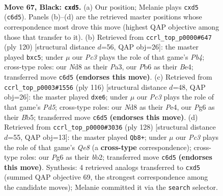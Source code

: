 \documentclass[11pt]{article}
\begin{document}
\clearpage

\begin{figure}[p]\centering
\begin{subfigure}{0.46\textwidth}\centering
\resizebox{\linewidth}{!}{%
\newchessgame
\chessboard[
  setfen={3n4/2k3p1/1pp3p1/p1pQ4/8/2P5/KP6/8 b - - 0 67},
  showmover=false,
  pgfstyle=straightmove, color=movearrow, markmove={c6-d5}
]}
\caption{}
\end{subfigure}\hfill
\begin{subfigure}{0.46\textwidth}\centering
\resizebox{\linewidth}{!}{%
\newchessgame
\chessboard[
  setfen={5k2/5p2/p7/1pq2P2/1P2B2b/P7/2P5/5K2 w - - 0 61},
  showmover=false,
  pgfstyle=straightmove, color=movearrow, markmove={b4-c5}
]}
\caption{}
\end{subfigure}
\\[4pt]
\begin{subfigure}{0.46\textwidth}\centering
\resizebox{\linewidth}{!}{%
\newchessgame
\chessboard[
  setfen={3b4/8/4q2k/1B1Pp2p/4Pp2/5P2/6PK/8 w - - 0 59},
  showmover=false,
  pgfstyle=straightmove, color=movearrow, markmove={d5-e6}
]}
\caption{}
\end{subfigure}\hfill
\begin{subfigure}{0.46\textwidth}\centering
\resizebox{\linewidth}{!}{%
\newchessgame
\chessboard[
  setfen={4Q3/8/1kq5/8/1P2pP2/P6P/1b4PK/8 w - - 3 65},
  showmover=false,
  pgfstyle=straightmove, color=movearrow, markmove={e8-b8}
]}
\caption{}
\end{subfigure}
\caption{\textbf{Move 67, Black: \texttt{cxd5}.} (a) Our position; Melanie plays \texttt{cxd5} (\texttt{c6d5}). Panels (b)--(d) are the retrieved master positions whose correspondence most drove this move (highest QAP objective among those that transfer to it). (b) Retrieved from \texttt{ccrl\_top\_p0000\#647} (ply 120) [structural distance $d$=56, QAP obj=26]: the master played \texttt{bxc5}; under $\mu$ our \emph{Pc3} plays the role of that game's \emph{Pb4}; cross-type roles: our \emph{N}d8 as their \emph{P}a3, our \emph{P}b6 as their \emph{B}e4; transferred move \texttt{c6d5} \textbf{(endorses this move)}. (c) Retrieved from \texttt{ccrl\_top\_p0003\#1556} (ply 116) [structural distance $d$=48, QAP obj=26]: the master played \texttt{dxe6}; under $\mu$ our \emph{Pc3} plays the role of that game's \emph{Pd5}; cross-type roles: our \emph{N}d8 as their \emph{P}e4, our \emph{P}g6 as their \emph{B}b5; transferred move \texttt{c6d5} \textbf{(endorses this move)}. (d) Retrieved from \texttt{ccrl\_top\_p0000\#3036} (ply 128) [structural distance $d$=55, QAP obj=13]: the master played \texttt{Qb8+}; under $\mu$ our \emph{Pc3} plays the role of that game's \emph{Qe8} (a \textbf{cross-type} correspondence); cross-type roles: our \emph{P}g6 as their \emph{b}b2; transferred move \texttt{c6d5} \textbf{(endorses this move)}. Synthesis: 4 retrieved analogs transferred to \texttt{cxd5} (summed QAP objective 69, the strongest correspondence among the candidate moves); Melanie committed it via the \texttt{search} selector.}
\label{fig:thought-m133}
\end{figure}
\end{document}
